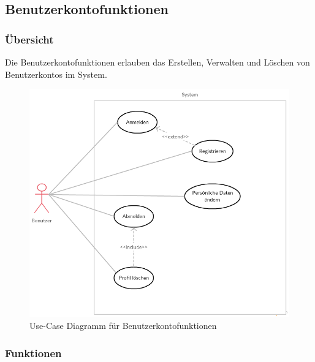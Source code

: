 \documentclass[parskip=full]{scrartcl}
\begin{document}
\subsection{Benutzerkontofunktionen}

\subsubsection{Übersicht}
Die Benutzerkontofunktionen erlauben das Erstellen, Verwalten und Löschen von Benutzerkontos im System.

\begin{figure}[H]
	\centering
	\includegraphics[width=.7\textwidth]{Use_Cases/use_case_Benutzerprofil.png}
	\caption{Use-Case Diagramm für Benutzerkontofunktionen}	
\end{figure}

\subsubsection{Funktionen}
\end{document}
